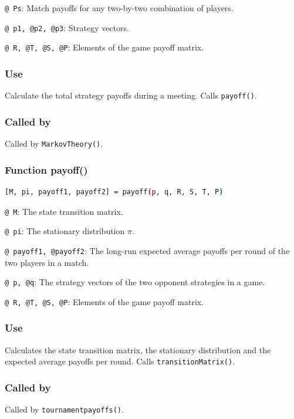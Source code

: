 \documentclass[12pt]{report}
\begin{document}
\texttt{@ Ps}: Match payoffs for any two-by-two combination of players.

\texttt{@ p1, @p2, @p3}: Strategy vectors.

\texttt{@ R, @T, @S, @P}: Elements of the game payoff matrix.

\subsubsection*{Use}
Calculate the total strategy payoffs during a meeting. Calls \texttt{payoff()}.

\subsubsection*{Called by}
Called by \texttt{MarkovTheory()}.







\subsubsection*{Function payoff()}

\begin{lstlisting}[language=bash]
[M, pi, payoff1, payoff2] = payoff(p, q, R, S, T, P)

\end{lstlisting}

\texttt{@ M}: The state transition matrix.

\texttt{@ pi}: The stationary distribution $\pi$.

\texttt{@ payoff1, @payoff2}: The long-run expected average payoffs per round of the two players in a match.

\texttt{@ p, @q}: The strategy vectors of the two opponent strategies in a game.

\texttt{@ R, @T, @S, @P}: Elements of the game payoff matrix.

\subsubsection*{Use}
Calculates the state transition matrix, the stationary distribution and the expected average payoffs per round. Calls \texttt{transitionMatrix()}.

\subsubsection*{Called by}
Called by \texttt{tournamentpayoffs()}.
\end{document}
